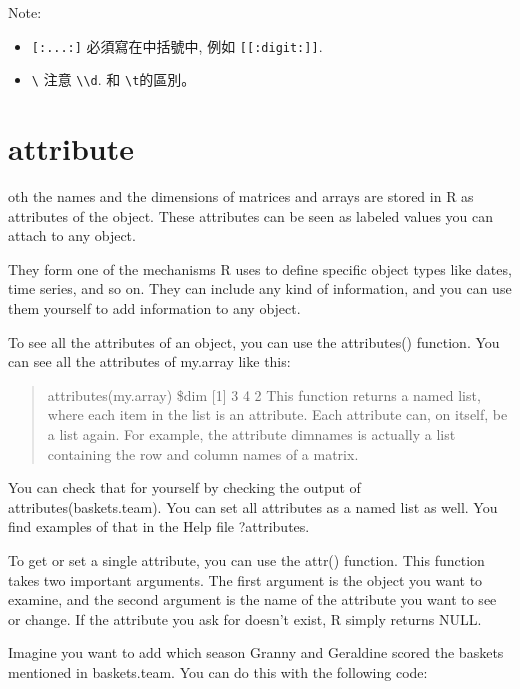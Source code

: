 \documentclass[]{book}
\providecommand{\tightlist}{%
  \setlength{\itemsep}{0pt}\setlength{\parskip}{0pt}}
\theoremstyle{definition}
\theoremstyle{definition}
\theoremstyle{definition}
\theoremstyle{remark}
\begin{document}
Note:

\begin{itemize}
\tightlist
\item
  \texttt{{[}:...:{]}} 必須寫在中括號中, 例如
  \texttt{{[}{[}:digit:{]}{]}}.\\
\item
  \texttt{\textbackslash{}} 注意
  \texttt{\textbackslash{}\textbackslash{}d}. 和
  \texttt{\textbackslash{}t}的區別。
\end{itemize}

\section{attribute}\label{attribute}

oth the names and the dimensions of matrices and arrays are stored in R
as attributes of the object. These attributes can be seen as labeled
values you can attach to any object.

They form one of the mechanisms R uses to define specific object types
like dates, time series, and so on. They can include any kind of
information, and you can use them yourself to add information to any
object.

To see all the attributes of an object, you can use the attributes()
function. You can see all the attributes of my.array like this:

\begin{quote}
attributes(my.array) \$dim {[}1{]} 3 4 2 This function returns a named
list, where each item in the list is an attribute. Each attribute can,
on itself, be a list again. For example, the attribute dimnames is
actually a list containing the row and column names of a matrix.
\end{quote}

You can check that for yourself by checking the output of
attributes(baskets.team). You can set all attributes as a named list as
well. You find examples of that in the Help file ?attributes.

To get or set a single attribute, you can use the attr() function. This
function takes two important arguments. The first argument is the object
you want to examine, and the second argument is the name of the
attribute you want to see or change. If the attribute you ask for
doesn't exist, R simply returns NULL.

Imagine you want to add which season Granny and Geraldine scored the
baskets mentioned in baskets.team. You can do this with the following
code:
\end{document}
